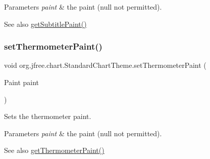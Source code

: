 \begin{DoxyParams}{Parameters}
{\em paint} & the paint ({\ttfamily null} not permitted).\\
\hline
\end{DoxyParams}
\begin{DoxySeeAlso}{See also}
\mbox{\hyperlink{classorg_1_1jfree_1_1chart_1_1_standard_chart_theme_ada6593c77d8f7fb0dd9bf3c3f9fffd79}{get\+Subtitle\+Paint()}} 
\end{DoxySeeAlso}
\mbox{\label{classorg_1_1jfree_1_1chart_1_1_standard_chart_theme_a581aacf90e7f0e85d5365218c2d635b4}} 
\subsubsection{\texorpdfstring{set\+Thermometer\+Paint()}{setThermometerPaint()}}
{\footnotesize\ttfamily void org.\+jfree.\+chart.\+Standard\+Chart\+Theme.\+set\+Thermometer\+Paint (\begin{DoxyParamCaption}\item[{Paint}]{paint }\end{DoxyParamCaption})}

Sets the thermometer paint.


\begin{DoxyParams}{Parameters}
{\em paint} & the paint ({\ttfamily null} not permitted).\\
\hline
\end{DoxyParams}
\begin{DoxySeeAlso}{See also}
\mbox{\hyperlink{classorg_1_1jfree_1_1chart_1_1_standard_chart_theme_a36af217e64d242998f929ff25f632c57}{get\+Thermometer\+Paint()}} 
\end{DoxySeeAlso}
\mbox{\label{classorg_1_1jfree_1_1chart_1_1_standard_chart_theme_a374d333d9b261f619420273d8ca062f3}} 
